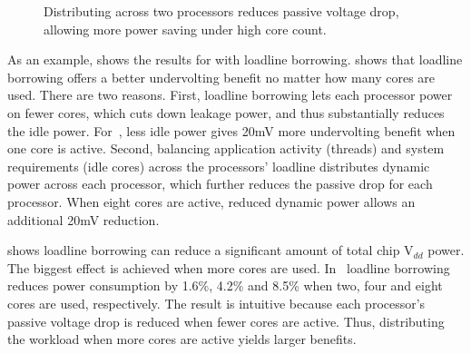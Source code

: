 \begin{figure}[t]
\centering
\vspace*{-10pt}
\hfill
{}
\caption{Distributing  across two processors reduces passive voltage drop, allowing more power saving under high core count.}
\vspace{-0.4cm}
\label{fig:split_raytrace}
\end{figure}

As an example,  shows the results for  with loadline borrowing.  shows that loadline borrowing offers a better undervolting benefit no matter how many cores are used. There are two reasons. First, loadline borrowing lets each processor power on fewer cores, which cuts down leakage power, and thus substantially reduces the idle power. For~, less idle power gives 20mV more undervolting benefit when one core is active. Second, balancing application activity (threads) and system requirements (idle cores) across the processors' loadline distributes dynamic power across each processor, which further reduces the passive drop for each processor. When eight cores are active, reduced dynamic power allows an additional 20mV reduction. 

 shows loadline borrowing can reduce a significant amount of total chip V$_{dd}$ power. The biggest effect is achieved when more cores are used. In~ loadline borrowing reduces power consumption by 1.6\%, 4.2\% and 8.5\% when two, four and eight cores are used, respectively. The result is intuitive because each processor's passive voltage drop is reduced when fewer cores are active. Thus, distributing the workload when more cores are active yields larger benefits. 

